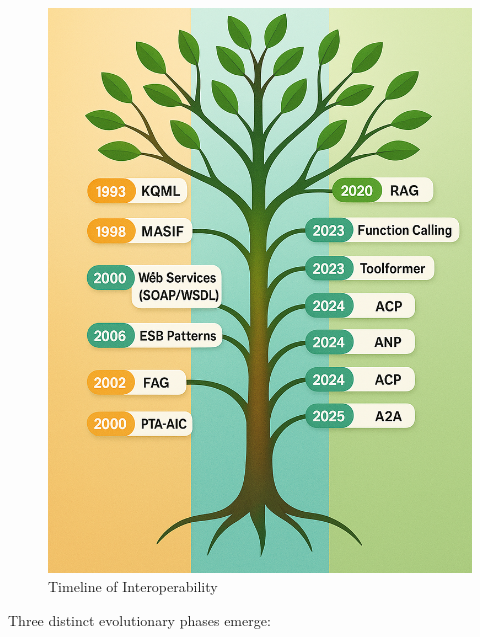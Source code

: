 \documentclass{article}
\begin{document}
\begin{figure}
    \centering
    \includegraphics[width=0.4\linewidth]{timeline_agent.png}
    \caption{Timeline of Interoperability}
    \label{fig:timeline}
\end{figure}





Three distinct evolutionary phases emerge:
\end{document}
